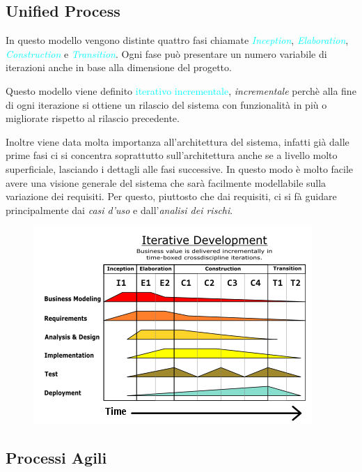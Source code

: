 \subsection{Unified Process}

In questo modello vengono distinte quattro fasi chiamate \emph{\textcolor{cyan}{Inception}}, \emph{\textcolor{cyan}{Elaboration}}, \emph{\textcolor{cyan}{Construction}}
e \emph{\textcolor{cyan}{Transition}}. Ogni fase può presentare un numero variabile di iterazioni anche in base alla dimensione
del progetto.

Questo modello viene definito \textcolor{cyan}{iterativo incrementale}, \emph{incrementale} perchè
alla fine di ogni iterazione si ottiene un rilascio del sistema con funzionalità in più o migliorate
rispetto al rilascio precedente.

Inoltre viene data molta importanza all'architettura del sistema, infatti già dalle prime fasi ci si
concentra soprattutto sull'architettura anche se a livello molto superficiale, lasciando i dettagli alle fasi successive. In questo
modo è molto facile avere una visione generale del sistema che sarà facilmente modellabile sulla variazione dei requisiti. Per
questo, piuttosto che dai requisiti, ci si fà guidare principalmente dai \emph{casi d'uso} e dall'\emph{analisi dei rischi}.

\begin{figure}[h]
    \begin{center}
        \includegraphics[scale=0.8]{img/unified_process.png}
    \end{center}
\end{figure}

\subsection{Processi Agili}


